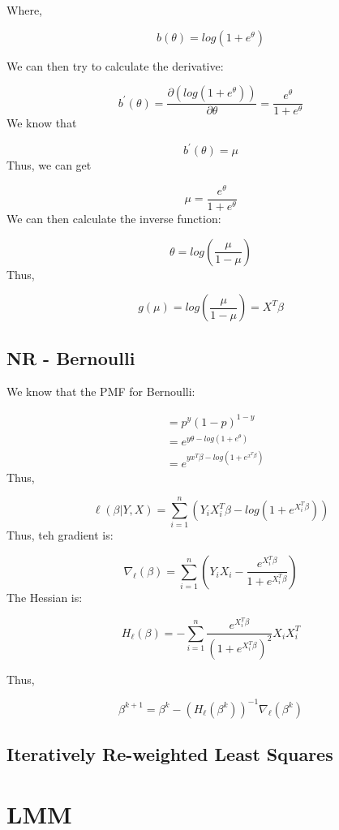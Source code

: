 \documentclass[]{book}
\begin{document}
Where,

\[b(\theta)=log(1+e^{\theta})\]

We can then try to calculate the derivative:

\[b^{'}(\theta)=\frac{\partial (log(1+e^{\theta}))}{\partial \theta}=\frac{e^{\theta}}{1+e^{\theta}}\]
We know that

\[b^{'}(\theta)=\mu\]
Thus, we can get

\[\mu=\frac{e^{\theta}}{1+e^{\theta}}\]
We can then calculate the inverse function:

\[\theta=log(\frac{\mu}{1-\mu})\]
Thus,

\[g(\mu)=log(\frac{\mu}{1-\mu})=X^T \beta\]

\hypertarget{nr---bernoulli}{%
\subsection{NR - Bernoulli}\label{nr---bernoulli}}

We know that the PMF for Bernoulli:

\[\begin{aligned} &= p^y(1-p)^{1-y} \\  &=e^{y\theta-log(1+e^{\theta})} \\ &=e^{yx^T \beta-log(1+e^{x^T \beta})} \end{aligned}\]
Thus,

\[\ell(\beta|Y,X)=\sum_{i=1}^{n}(Y_iX_i^{T}\beta-log(1+e^{X_i^T \beta}))\]
Thus, teh gradient is:

\[\nabla_{\ell}(\beta)=\sum_{i=1}^{n}(Y_iX_i - \frac{e^{X_i^T \beta}}{1+e^{X_i^T \beta}})\]
The Hessian is:

\[H_{\ell}(\beta)=-\sum_{i=1}^{n}\frac{e^{X_i^T \beta}}{(1+e^{X_i^T \beta})^2}X_iX_i^T\]

Thus,

\[\beta^{k+1}=\beta^k-(H_{\ell}(\beta^k))^{-1}\nabla_{\ell}(\beta^k) \]

\hypertarget{iteratively-re-weighted-least-squares}{%
\subsection{Iteratively Re-weighted Least Squares}\label{iteratively-re-weighted-least-squares}}

\hypertarget{lmm}{%
\section{LMM}\label{lmm}}
\end{document}
